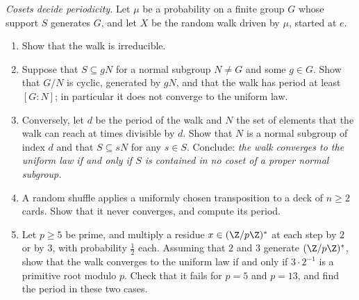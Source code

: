 \begin{exercise}[$\star\star\star$]\label{pb:period}
\emph{Cosets decide periodicity.} Let $\mu$ be a probability on a finite group $G$ whose support $S$ generates $G$, and let $X$ be the
random walk driven by $\mu$, started at $e$.
\begin{enumerate}[label=(\alph*)]
\item Show that the walk is irreducible.
\item Suppose that $S\subseteq gN$ for a normal subgroup $N\ne G$ and some $g\in G$. Show that $G/N$ is cyclic, generated by $gN$, and that the
walk has period at least $[G:N]$; in particular it does not converge to the uniform law.
\item Conversely, let $d$ be the period of the walk and $N$ the set of elements that the walk can reach at times divisible by
$d$. Show that $N$ is a normal subgroup of index $d$ and that $S\subseteq sN$ for any $s\in S$. Conclude: \emph{the walk converges to the
uniform law if and only if $S$ is contained in no coset of a proper normal subgroup.}
\item A random shuffle applies a uniformly chosen transposition to a deck of $n\ge2$ cards. Show that it never converges, and
compute its period.
\item Let $p\ge5$ be prime, and multiply a residue $x\in(\Z/p\Z)^*$ at each step by $2$ or by $3$, with probability $\frac12$ each. Assuming
that $2$ and $3$ generate $(\Z/p\Z)^*$, show that the walk converges to the uniform law if and only if $3\cdot2^{-1}$ is a primitive root
modulo $p$. Check that it fails for $p=5$ and $p=13$, and find the period in these two cases.
\end{enumerate}
\end{exercise}

